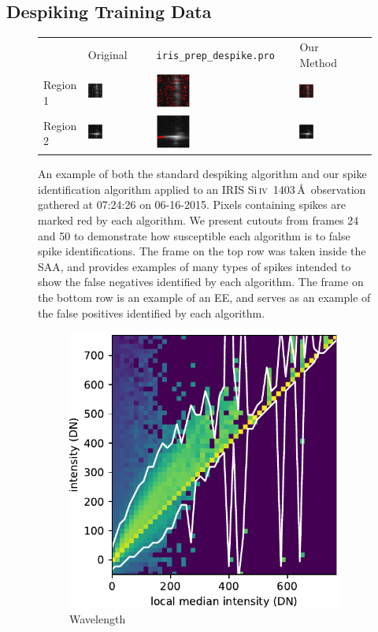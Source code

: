 \documentclass[10pt,letterpaper, doublespace]{article}
\newcommand{\SiIV}{Si\,\textsc{iv}~1403\,\AA}
\newcommand{\tilewidth}{0.25\textwidth}
\newcommand{\EE}{\ac{EE}}
\newcommand{\SAA}{\ac{SAA}}
\begin{document}
		\subsection{Despiking Training Data}	\label{sec_dspk}	
			
			\begin{figure}[h!]
	
				\renewcommand{\arraystretch}{0}
				\setlength{\tabcolsep}{0pt}
				\begin{tabular}{m{} m{\tilewidth} m{\tilewidth} m{\tilewidth} @{}m{0pt}@{}}
					& \centering Original & \centering \texttt{iris\_prep\_despike.pro} & \centering Our Method & \\[5mm]
					Region 1 & \includegraphics[width=\tilewidth]{fig/orig_1} & \includegraphics[width=\tilewidth]{fig/despike_1} & \includegraphics[width=\tilewidth]{fig/dspk_1} & \\
					Region 2 & \includegraphics[width=\tilewidth]{fig/orig_2} & \includegraphics[width=\tilewidth]{fig/despike_2} & \includegraphics[width=\tilewidth]{fig/dspk_2} & \\
				\end{tabular}
				
				\caption{An example of both the standard despiking algorithm and our spike identification algorithm applied to an IRIS \SiIV\ observation gathered at 07:24:26 on 06-16-2015.
					Pixels containing spikes are marked red by each algorithm.
					We present cutouts from frames 24 and 50 to demonstrate how susceptible each algorithm is to false spike identifications. 
					The frame on the top row was taken inside the \SAA, and provides examples of many types of spikes intended to show the false negatives identified by each algorithm.
					The frame on the bottom row is an example of an \EE, and serves as an example of the false positives identified by each algorithm.}
				
				\label{dspk_ex}
				
			\end{figure}
			
			\begin{figure}[h!]
				\centering
				\begin{subfigure}[t]{0.288\textwidth}
					\centering
					\includegraphics[width=\textwidth]{fig/hist_0}
					\caption{Wavelength}
				\end{subfigure}
				~ 
				\begin{subfigure}[t]{0.288\textwidth}
					\centering
	
\end{subfigure}
\end{figure}
\end{document}
